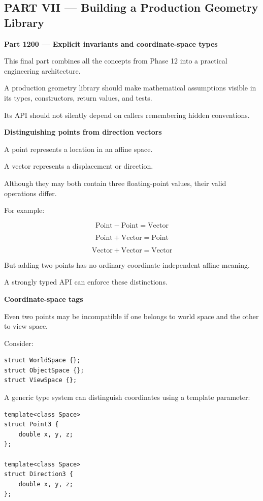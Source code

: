 \subsection{PART VII --- Building a Production Geometry Library}\label{04-visual-computing-ii-ch023-part-vii-building-a-production-geometry-library}

\hypertarget{04-visual-computing-ii-ch023-part-vii-building-a-production-geometry-library}{}

\textbf{Part 1200 --- Explicit invariants and coordinate-space types}

This final part combines all the concepts from Phase 12 into a practical engineering architecture.

A production geometry library should make mathematical assumptions visible in its types, constructors, return values, and tests.

Its API should not silently depend on callers remembering hidden conventions.

\textbf{Distinguishing points from direction vectors}

A point represents a location in an affine space.

A vector represents a displacement or direction.

Although they may both contain three floating-point values, their valid operations differ.

For example:

\[
\text{Point}-\text{Point}=\text{Vector}
\]

\[
\text{Point}+\text{Vector}=\text{Point}
\]

\[
\text{Vector}+\text{Vector}=\text{Vector}
\]

But adding two points has no ordinary coordinate-independent affine meaning.

A strongly typed API can enforce these distinctions.

\textbf{Coordinate-space tags}

Even two points may be incompatible if one belongs to world space and the other to view space.

Consider:

\begin{verbatim}
struct WorldSpace {};
struct ObjectSpace {};
struct ViewSpace {};
\end{verbatim}

A generic type system can distinguish coordinates using a template parameter:

\begin{verbatim}
template<class Space>
struct Point3 {
    double x, y, z;
};

template<class Space>
struct Direction3 {
    double x, y, z;
};
\end{verbatim}


